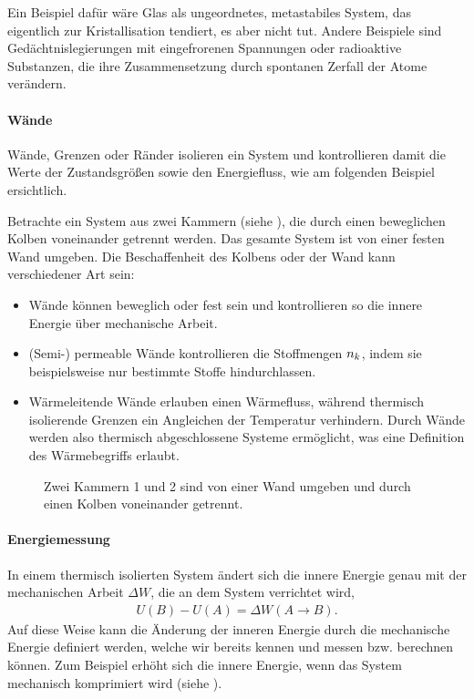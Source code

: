 Ein Beispiel dafür %
wäre Glas als ungeordnetes, metastabiles System, das eigentlich zur Kristallisation tendiert, es aber nicht tut. Andere Beispiele sind Gedächtnislegierungen mit eingefrorenen Spannungen oder radioaktive Substanzen, die ihre Zusammensetzung durch spontanen Zerfall der Atome verändern.


\paragraph*{Wände}

Wände, Grenzen oder Ränder isolieren ein System und kontrollieren damit die Werte der Zustandsgrößen sowie den Energiefluss, wie am folgenden Beispiel ersichtlich.

Betrachte ein System aus zwei Kammern (siehe ), die durch einen beweglichen Kolben voneinander getrennt werden. Das gesamte System ist von einer festen Wand umgeben. Die Beschaffenheit des Kolbens oder der Wand kann verschiedener Art sein:
\begin{itemize}
    \item Wände können beweglich oder fest sein und kontrollieren so die innere Energie über mechanische Arbeit.
    \item (Semi-) permeable Wände kontrollieren die Stoffmengen $n_k$, indem sie beispielsweise nur bestimmte Stoffe hindurchlassen.
    \item Wärmeleitende Wände erlauben einen Wärmefluss, während thermisch isolierende Grenzen ein Angleichen der Temperatur verhindern. Durch Wände werden also thermisch abgeschlossene Systeme ermöglicht, was eine Definition des Wärmebegriffs erlaubt.
\end{itemize}

\begin{figure}[b]
    \centering
    \tfigTwoChambersSeparatedByPiston
    \caption{Zwei Kammern 1 und 2 sind von einer Wand umgeben und durch einen Kolben voneinander getrennt. }
    \label{fig:TwoChambersSeparatedByPiston}
\end{figure}




\paragraph*{Energiemessung}

In einem thermisch isolierten System ändert sich die innere Energie genau mit der mechanischen Arbeit $\Delta W$, die an dem System verrichtet wird,
\begin{align*}
    U(B)-U(A) =\Delta W(A\rightarrow B).
\end{align*}
Auf diese Weise kann die Änderung der inneren Energie durch die mechanische Energie definiert werden, welche wir bereits kennen und messen bzw. berechnen können.
Zum Beispiel erhöht sich die innere Energie, wenn das System mechanisch komprimiert wird (siehe ).


